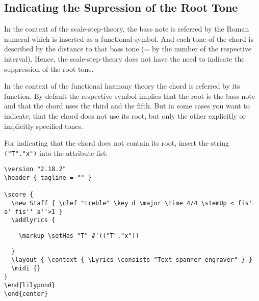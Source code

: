 \documentclass[
  DIV=calc,
  BCOR=5mm,
  12pt,
  headings=small,
  oneside,
  abstract=true,
  toc=bib,
  xcolor=dvipsnames,
  openany,
  ngerman,english]{scrartcl}
\begin{document}
\subsection{Indicating the Supression of the Root Tone}

In the context of the scale-step-theory, the bass note is referred by the Roman
numeral which is inserted as a functional symbol. And each tone of the chord is
described by the distance to that bass tone (= by the number of the respective
interval). Hence, the scale-step-theory does not have the need to indicate the
suppression of the root tone.

In the context of the functional harmony theory the chord is referred by its
function. By default the respective symbol implies that the root is the bass
note and that the chord uses the third and the fifth. But in some cases you want
to indicate, that the chord does not use its root, but only the other
explicitly or implicitly specified tones.

For indicating that the chord does not contain its root, insert the string
\texttt{("T"."x")} into the attribute list:

\begin{center}
\end{center}

\begin{scriptsize}
\begin{verbatim}
\version "2.18.2"
\header { tagline = "" }

\score {
  \new Staff { \clef "treble" \key d \major \time 4/4 \stemUp < fis' a' fis'' a''>1 }
  \addlyrics { 
\end{verbatim}
{ \color{red} \verb|    \markup \setHas "T" #'(("T"."x"))| }
\begin{verbatim}    
  }
  \layout { \context { \Lyrics \consists "Text_spanner_engraver" } }
  \midi {}
}
\end{lilypond}
\end{center}
\end{verbatim}
\end{scriptsize}
\end{document}
